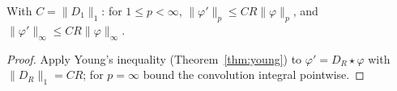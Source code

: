 \begin{theorem}\label{thm:bernstein_lp}
\leanok
With $C = \lVert D_1\rVert_1$: for $1 \le p < \infty$, $\lVert\varphi'\rVert_p \le C R \lVert\varphi\rVert_p$, and $\lVert\varphi'\rVert_\infty \le C R \lVert\varphi\rVert_\infty$.
\end{theorem}

\begin{proof}
\leanok
Apply Young's inequality (Theorem~\ref{thm:young}) to $\varphi' = D_R \star \varphi$ with $\lVert D_R\rVert_1 = CR$; for $p = \infty$ bound the convolution integral pointwise.
\end{proof}
